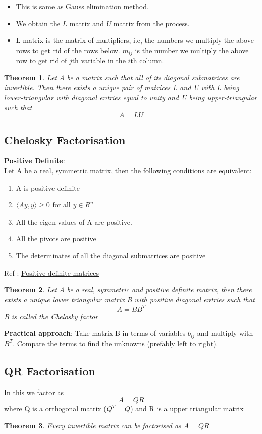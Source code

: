 \documentclass{article}
\newtheorem*{theorem}{Theorem}
\begin{document}
		\begin{itemize}
			\item This is same as Gauss elimination method.
			\item We obtain the $L$ matrix and $U$ matrix from the process. 
			\item L matrix is the matrix of multipliers, i.e, the numbers we multiply the above rows to get rid of the rows below. $m_{ij}$ is the number we multiply the above row to get rid of $j$th variable in the $i$th column.
		\end{itemize}

		\begin{theorem}
		Let A be a matrix such that all of its diagonal submatrices are invertible. Then there {exists} a unique pair of matrices L and U with L being lower-triangular with diagonal entries equal to unity and U being upper-triangular such that
		\[A= LU\]
		\end{theorem}

	\subsection{Chelosky Factorisation}
		\textbf{Positive Definite}:\\
		Let A be a real, symmetric matrix, then the following conditions are equivalent:
		\begin{enumerate}
		\item A is positive definite
		\item $\langle Ay, y \rangle \geq 0$  for all $y\in R^n$ 
		\item All the eigen values of A are positive.
		\item All the pivots are positive
		\item The determinates of all the diagonal submatrices are positive
		\end{enumerate}
		Ref : \href{http://slpl.cse.nsysu.edu.tw/chiaping/la/pdm.pdf}{Positive definite matrices}

		\begin{theorem}
			Let A be a \emph{real, symmetric and positive definite matrix}, then there exists a unique lower triangular matrix B with positive diagonal entries such that 
			\[A = BB^T\]
			B is called the Chelosky factor
		\end{theorem}

		\textbf{Practical approach}: Take matrix B in terms of variables $b_{ij}$ and multiply with $B^T$. Compare the terms to find the unknowns (prefably left to right).

	\subsection{QR Factorisation}
		In this we factor as 
		\[A = QR\]
		where Q is a orthogonal matrix ($Q^T = Q$) and R is a upper triangular matrix

		\begin{theorem}
			Every invertible matrix can be factorised as $A= QR$
		\end{theorem}
\end{document}
